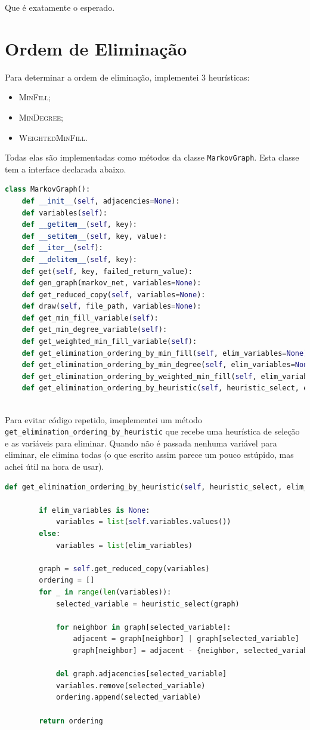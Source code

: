 \documentclass[paper=a4, fontsize=11pt]{scrartcl} %
\numberwithin{equation}{subsection}
\numberwithin{figure}{subsection}
\numberwithin{table}{subsection}
\numberwithin{definition}{subsection}
\numberwithin{theorem}{subsection}
\numberwithin{property}{subsection}
\numberwithin{proposition}{subsection}
\numberwithin{equation}{section}
\numberwithin{figure}{section}
\numberwithin{table}{section}
\numberwithin{definition}{section}
\numberwithin{theorem}{section}
\numberwithin{property}{section}
\numberwithin{proposition}{section}
\begin{document}
Que é exatamente o esperado.

\section{Ordem de Eliminação}

Para determinar a ordem de eliminação, implementei 3 heurísticas:
\begin{itemize}
  \item \textsc{MinFill};
  \item \textsc{MinDegree};
  \item \textsc{WeightedMinFill}.
\end{itemize}

Todas elas são implementadas como métodos da classe \verb|MarkovGraph|. Esta classe tem a interface declarada abaixo.
\begin{lstlisting}[language=python]
class MarkovGraph():
    def __init__(self, adjacencies=None):
    def variables(self):
    def __getitem__(self, key):
    def __setitem__(self, key, value):
    def __iter__(self):
    def __delitem__(self, key):
    def get(self, key, failed_return_value):
    def gen_graph(markov_net, variables=None):
    def get_reduced_copy(self, variables=None):
    def draw(self, file_path, variables=None):
    def get_min_fill_variable(self):
    def get_min_degree_variable(self):
    def get_weighted_min_fill_variable(self):
    def get_elimination_ordering_by_min_fill(self, elim_variables=None):
    def get_elimination_ordering_by_min_degree(self, elim_variables=None):
    def get_elimination_ordering_by_weighted_min_fill(self, elim_variables=None):
    def get_elimination_ordering_by_heuristic(self, heuristic_select, elim_variables=None):
    
\end{lstlisting}


Para evitar código repetido, imeplementei um método \verb|get_elimination_ordering_by_heuristic| que recebe uma heurística de seleção e as variáveis para eliminar. Quando não é passada nenhuma variável para eliminar, ele elimina todas (o que escrito assim parece um pouco estúpido, mas achei útil na hora de usar).
\begin{lstlisting}[language=python]
    def get_elimination_ordering_by_heuristic(self, heuristic_select, elim_variables=None):

        if elim_variables is None:
            variables = list(self.variables.values())
        else:
            variables = list(elim_variables)

        graph = self.get_reduced_copy(variables)
        ordering = []
        for _ in range(len(variables)):
            selected_variable = heuristic_select(graph)

            for neighbor in graph[selected_variable]:
                adjacent = graph[neighbor] | graph[selected_variable]
                graph[neighbor] = adjacent - {neighbor, selected_variable}

            del graph.adjacencies[selected_variable]
            variables.remove(selected_variable)
            ordering.append(selected_variable)

        return ordering
\end{lstlisting}
\end{document}
